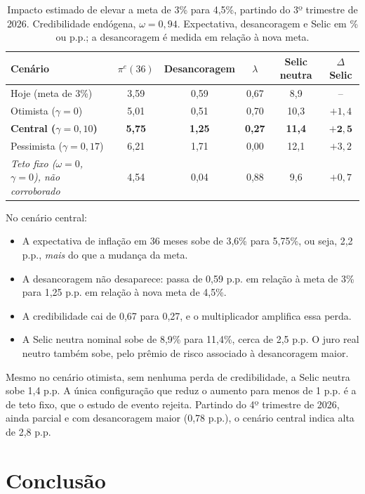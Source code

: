 \documentclass[11pt,a4paper]{article}
\newcommand{\pe}{\pi^{e}}
\begin{document}
\begin{table}[H]
\centering
\begin{tabular}{lccccc}
\toprule
Cenário & $\pe(36)$ & Desancoragem & $\lambda$ & Selic neutra & $\Delta$ Selic \\
\midrule
Hoje (meta de 3\%) & 3,59 & 0,59 & 0,67 & 8,9 & -- \\
\midrule
Otimista ($\gamma=0$) & 5,01 & 0,51 & 0,70 & 10,3 & $+1{,}4$ \\
\textbf{Central ($\gamma=0{,}10$)} & \textbf{5,75} & \textbf{1,25} & \textbf{0,27} & \textbf{11,4} & $\mathbf{+2{,}5}$ \\
Pessimista ($\gamma=0{,}17$) & 6,21 & 1,71 & 0,00 & 12,1 & $+3{,}2$ \\
\midrule
\emph{Teto fixo ($\omega=0$, $\gamma=0$), não corroborado} & 4,54 & 0,04 & 0,88 & 9,6 & $+0{,}7$ \\
\bottomrule
\end{tabular}
\caption{Impacto estimado de elevar a meta de 3\% para 4,5\%, partindo do 3º trimestre de 2026. Credibilidade endógena, $\omega=0{,}94$. Expectativa, desancoragem e Selic em \% ou p.p.; a desancoragem é medida em relação à nova meta.}
\label{tab:impacto}
\end{table}

No cenário central:
\begin{itemize}
  \item A expectativa de inflação em 36 meses sobe de 3,6\% para 5,75\%, ou seja, 2,2 p.p., \emph{mais} do que a mudança da meta.
  \item A desancoragem não desaparece: passa de 0,59 p.p. em relação à meta de 3\% para 1,25 p.p. em relação à nova meta de 4,5\%.
  \item A credibilidade cai de 0,67 para 0,27, e o multiplicador amplifica essa perda.
  \item A Selic neutra nominal sobe de 8,9\% para 11,4\%, cerca de 2,5 p.p. O juro real neutro também sobe, pelo prêmio de risco associado à desancoragem maior.
\end{itemize}

Mesmo no cenário otimista, sem nenhuma perda de credibilidade, a Selic neutra sobe 1,4 p.p. A única configuração que reduz o aumento para menos de 1 p.p. é a de teto fixo, que o estudo de evento rejeita. Partindo do 4º trimestre de 2026, ainda parcial e com desancoragem maior (0,78 p.p.), o cenário central indica alta de 2,8 p.p.

\section{Conclusão}
\end{document}
